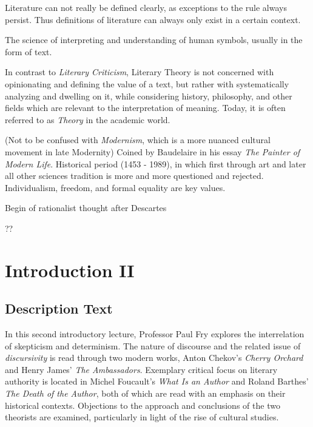 \documentclass[]{scrartcl}
\begin{document}
\begin{description}[leftmargin=!,labelwidth=\widthof{\bfseries Cartesian Revolution}]
  \item[Literature] Literature can not really be defined clearly, as exceptions to the rule always persist. Thus definitions of literature can always only exist in a certain context.
  \item[Hermeneutics] The science of interpreting and understanding of human symbols, usually in the form of text.
  \item[Literary Theory] In contrast to \emph{Literary Criticism}, Literary Theory is not concerned with opinionating and defining the value of a text, but rather with systematically analyzing and dwelling on it, while considering history, philosophy, and other fields which are relevant to the interpretation of meaning. Today, it is often referred to as \emph{Theory} in the academic world.
  \item[Modernity] (Not to be confused with \emph{Modernism}, which is a more nuanced cultural movement in late Modernity) Coined by Baudelaire in his essay \emph{The Painter of Modern Life}. Historical period (1453 - 1989), in which first through art and later all other sciences tradition is more and more questioned and rejected. Individualism, freedom, and formal equality are key values.
  \item[Cartesian Revolution] Begin of rationalist thought after Descartes
  \item[Verfremdung] ??
\end{description}

\section{Introduction II}

\vspace{15pt}

\subsection{Description Text}
In this second introductory lecture, Professor Paul Fry explores the interrelation of skepticism and determinism. The nature of discourse and the related issue of \emph{discursivity} is read through two modern works, Anton Chekov's \emph{Cherry Orchard} and Henry James' \emph{The Ambassadors}. Exemplary critical focus on literary authority is located in Michel Foucault's \emph{What Is an Author} and Roland Barthes' \emph{The Death of the Author}, both of which are read with an emphasis on their historical contexts. Objections to the approach and conclusions of the two theorists are examined, particularly in light of the rise of cultural studies.
\end{document}
